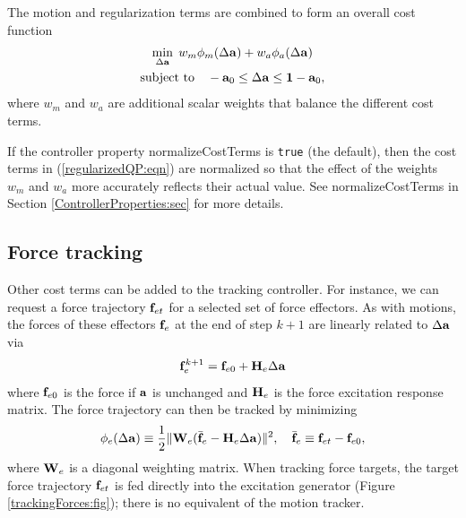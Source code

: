 The motion and regularization terms are combined to form
an overall cost function
%
\begin{gather}
\min_{\Delta {\bf a}} \; w_m \phi_m(\Delta {\bf a}) + w_a \phi_a (\Delta {\bf a}) \notag \\
\text{subject to} \quad -{\bf a}_0 \le \Delta {\bf a} \le {\bf 1} - {\bf a}_0,
\label{regularizedQP:eqn}
\end{gather}
%
where $w_m$ and $w_a$ are additional scalar weights that balance the
different cost terms.

\begin{sideblock}
If the controller property {\sf normalizeCostTerms} is {\tt true} (the
default), then the cost terms in (\ref{regularizedQP:eqn}) are normalized so
that the effect of the weights $w_m$ and $w_a$ more accurately reflects their
actual value. See {\sf normalizeCostTerms} in
Section \ref{ControllerProperties:sec} for more details.
\end{sideblock}

\subsection{Force tracking}
\label{ForceTracking:sec}

Other cost terms can be added to the tracking controller.  For
instance, we can request a force trajectory ${\bf f}_{et}$ for a selected set
of force effectors. As with motions, the forces of these effectors
${\bf f}_e$ at the end of step $k+1$ are linearly related to $\Delta {\bf a}$ via
%
\begin{equation*}
{\bf f}_e^{k+1} = {\bf f}_{e0} + {\bf H}_e \Delta {\bf a}
\end{equation*}
%
where ${\bf f}_{e0}$ is the force if ${\bf a}$ is unchanged and ${\bf H}_e$ is
the force excitation response matrix. The force trajectory can
then be tracked by minimizing
%
\begin{equation}
\phi_e(\Delta {\bf a}) \equiv 
\frac{1}{2} \| {\bf W}_e (\bar{{\bf f}}_e - {\bf H}_e \Delta {\bf a}) \|^2, \quad
\bar{{\bf f}}_e \equiv {\bf f}_{et} - {\bf f}_{e0},
\label{forceEffectorCostTerm:eqn}	
\end{equation}
%
where ${\bf W}_e$ is a diagonal weighting matrix.
When tracking force targets, the target force trajectory ${\bf f}_{et}$ is fed
directly into the excitation generator (Figure \ref{trackingForces:fig}); there
is no equivalent of the motion tracker.

